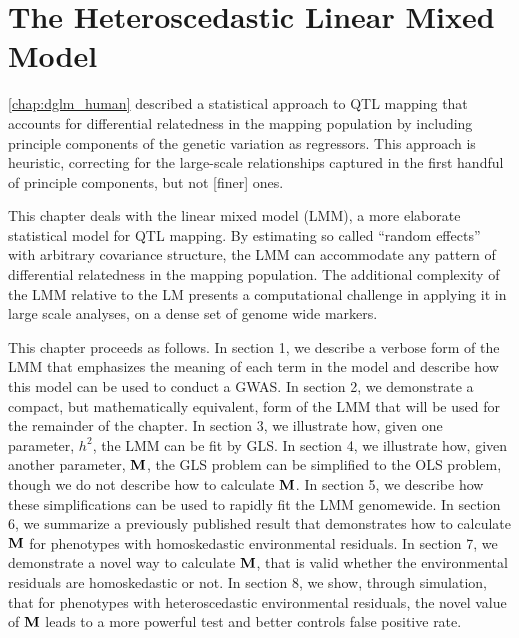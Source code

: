 \chapter{The Heteroscedastic Linear Mixed Model}
\label{chap:het_LMM}

\cref{chap:dglm_human} described a statistical approach to QTL mapping that accounts for differential relatedness in the mapping population by including principle components of the genetic variation as regressors.
This approach is heuristic, correcting for the large-scale relationships captured in the first handful of principle components, but not [finer] ones.

This chapter deals with the linear mixed model (LMM), a more elaborate statistical model for QTL mapping.
By estimating so called ``random effects'' with arbitrary covariance structure, the LMM can accommodate any pattern of differential relatedness in the mapping population.
The additional complexity of the LMM relative to the LM presents a computational challenge in applying it in large scale analyses, \eg on a dense set of genome wide markers.

This chapter proceeds as follows.
In section 1, we describe a verbose form of the LMM that emphasizes the meaning of each term in the model and describe how this model can be used to conduct a GWAS.
In section 2, we demonstrate a compact, but mathematically equivalent, form of the LMM that will be used for the remainder of the chapter.
In section 3, we illustrate how, given one parameter, $h^2$, the LMM can be fit by GLS.
In section 4, we illustrate how, given another parameter, $\mathbf{M}$, the GLS problem can be simplified to the OLS problem, though we do not describe how to calculate $\mathbf{M}$.
In section 5, we describe how these simplifications can be used to rapidly fit the LMM genomewide.
In section 6, we summarize a previously published result that demonstrates how to calculate $\mathbf{M}$ for phenotypes with homoskedastic environmental residuals.
In section 7, we demonstrate a novel way to calculate $\mathbf{M}$, that is valid whether the environmental residuals are homoskedastic or not.
In section 8, we show, through simulation, that for phenotypes with heteroscedastic environmental residuals, the novel value of $\mathbf{M}$ leads to a more powerful test and better controls false positive rate.



